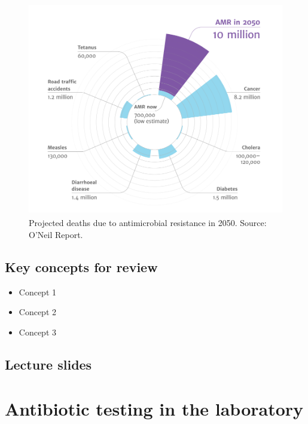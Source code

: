 \documentclass[
  letterpaper,
  DIV=11,
  numbers=noendperiod]{scrreprt}
\providecommand{\tightlist}{%
  \setlength{\itemsep}{0pt}\setlength{\parskip}{0pt}}\usepackage{longtable,booktabs,array}
\begin{document}
\begin{figure}

{\centering 

\includegraphics{images/AMR_deaths_2050.png}

}

\caption{\label{fig-oneilreport}Projected deaths due to antimicrobial
resistance in 2050. Source: O'Neil Report.}

\end{figure}

\hypertarget{key-concepts-for-review}{%
\section{Key concepts for review}\label{key-concepts-for-review}}

\begin{itemize}
\tightlist
\item
  Concept 1
\item
  Concept 2
\item
  Concept 3
\end{itemize}

\hypertarget{lecture-slides}{%
\section{Lecture slides}\label{lecture-slides}}


\hypertarget{antibiotic-testing-in-the-laboratory-1}{%
\chapter{Antibiotic testing in the
laboratory}\label{antibiotic-testing-in-the-laboratory-1}}
\end{document}
